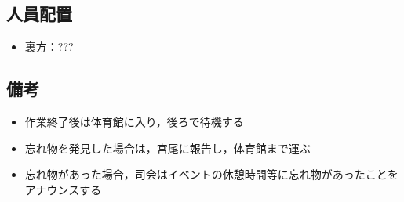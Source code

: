 \subsection{人員配置}
\begin{itemize}
\item 裏方：???
\end{itemize}

\subsection{備考}
\begin{itemize}
  \item 作業終了後は体育館に入り，後ろで待機する
  \item 忘れ物を発見した場合は，宮尾に報告し，体育館まで運ぶ
  \item 忘れ物があった場合，司会はイベントの休憩時間等に忘れ物があったことをアナウンスする
\end{itemize}

%


